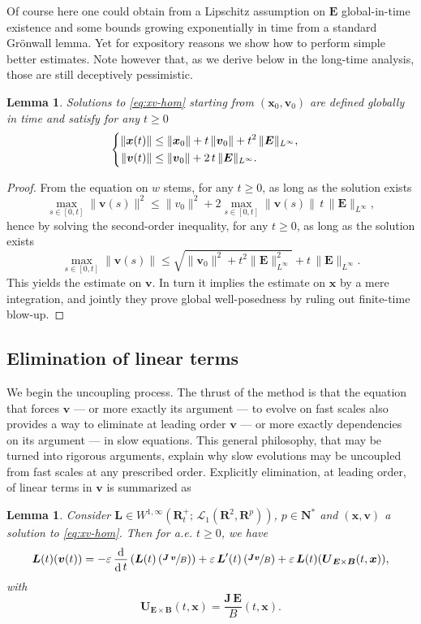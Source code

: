 \documentclass[10pt]{amsart}
\let\mathcal\mathscr
\newenvironment{splitcases}
{\begin{cases}\begin{aligned}}
{\end{aligned}\end{cases}}
\let\eps\varepsilon
\DeclareMathOperator\dD{d}\let\dd\dD
\theoremstyle{plain}
\newtheorem{lemma}[theorem]{Lemma}
\theoremstyle{definition}
\newcommand{\be}{\begin{equation}}
\newcommand{\ee}{\end{equation}}
\newcommand{\bl}{\begin{lemma}}
\newcommand{\el}{\end{lemma}}
\newcommand\R{\mathbf R}
\newcommand{\N}{\mathbf N}
\newcommand\bB{{\boldsymbol B}}
\newcommand\bE{{\boldsymbol E}}
\newcommand\bJ{{\boldsymbol J}}
\newcommand\bL{{\boldsymbol L}}
\newcommand\bU{{\boldsymbol U}}
\newcommand\bfv{{\boldsymbol v}}
\newcommand\bfx{{\boldsymbol x}}
\newcommand\cL{{\mathcal L}}
\let\e w
\newcommand{\EcB}{\bU_{\bE\times\bB}}
\begin{document}
Of course here one could obtain from a Lipschitz assumption on $\bE$ global-in-time existence and some bounds growing exponentially in time from a standard Grönwall lemma. Yet for expository reasons we show how to perform simple better estimates. Note however that, as we derive below in the long-time analysis, those are still deceptively pessimistic.

\bl
\label{toy-bnd0}
Solutions to \eqref{eq:xv-hom} starting from $(\bfx_0,\bfv_0)$ are
defined globally in time and satisfy for any $t\geq0$
\[
\begin{splitcases}
\|\bfx(t)\|&\leq \|\bfx_0\|
+t\,\|\bfv_0\|+t^2\,\|\bE\|_{L^\infty},
\\
\|\bfv(t)\|&\leq
\|\bfv_0\|+2\,t\,\|\bE\|_{L^\infty}.
\end{splitcases}
\]
\el
\begin{proof}
From the equation on $\e$ stems, for any $t\geq0$, as long as the solution exists
\[
\max_{s\in[0,t]}\|\bfv(s)\|^2\leq
\|v_0\|^2+2\max_{s\in[0,t]}\|\bfv(s)\|\,t\,\|\bE\|_{L^\infty},
\]
hence by solving the second-order inequality, for any $t\geq0$, as long as the solution exists
\[
\max_{s\in[0,t]}\|\bfv(s)\|\leq
\sqrt{\|\bfv_0\|^2+t^2\|\bE\|_{L^\infty}^2}+t\,\|\bE\|_{L^\infty}.
\]
This yields the estimate on $\bfv$. In turn it implies the estimate on $\bfx$ by a mere integration, and jointly they prove global well-posedness by ruling out finite-time blow-up.
\end{proof}

\subsection{Elimination of linear terms}

We begin the uncoupling process. The thrust of the method is that the
equation that forces $\bfv$ --- or more exactly its argument --- to
evolve on fast scales also provides a way to eliminate at leading
order $\bfv$ --- or more exactly dependencies on its argument --- in
slow equations. This general philosophy, that may be turned into
rigorous arguments, explain why slow evolutions may be uncoupled from
fast scales at any prescribed order. Explicitly elimination, at leading order, of linear terms in $\bfv$ is summarized as

\bl
\label{toy-1st}
Consider $\bL\in W^{1,\infty}\left(\R^+_t;\,\cL_1(\R^2,\R^p)\right)$, $p\in\N^*$ and $(\bfx,\bfv)$ a solution to \eqref{eq:xv-hom}. Then
for a.e. $t\geq 0$, we have
\be
\label{toy-res:0}
\bL(t)(\bfv(t))=-\eps\,\frac{\dD}{\dD t}\left(\bL(t)\left(\sfrac{\bJ\,\bfv}{B}\right)\right)
+\eps \,\bL'(t)\left(\sfrac{\bJ\bfv}{B}\right)
+\eps \,\bL(t)(\EcB(t,\bfx)),
\ee
with
\[
\EcB(t,\bfx)=\frac{\bJ \,\bE}{B}(t,\bfx).
\]
\el
\end{document}
